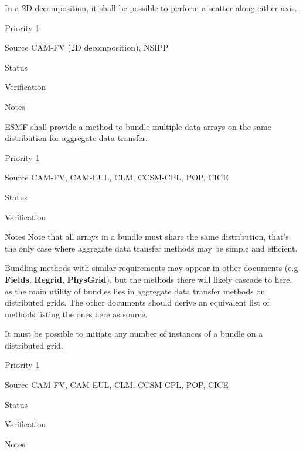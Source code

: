 
In a 2D decomposition, it shall be possible to perform a scatter along
either axis.

\begin{reqlist}
\item[Priority] 1
\item[Source] CAM-FV (2D decomposition), NSIPP
\item[Status]
\item[Verification]
\item[Notes] 
\end{reqlist}


ESMF shall provide a method to bundle multiple data arrays on the same
distribution for aggregate data transfer.

\begin{reqlist}
\item[Priority] 1
\item[Source] CAM-FV, CAM-EUL, CLM, CCSM-CPL, POP, CICE
\item[Status]
\item[Verification]
\item[Notes] Note that all arrays in a bundle must share the same
  distribution, that's the only case where aggregate data transfer
  methods may be simple and efficient.
  
  Bundling methods with similar requirements may appear in other
  documents (e.g \textbf{Fields}, \textbf{Regrid}, \textbf{PhysGrid}),
  but the methods there will likely cascade to here, as the main
  utility of bundles lies in aggregate data transfer methods on
  distributed grids. The other documents should derive an equivalent
  list of methods listing the ones here as source.
\end{reqlist}


It must be possible to initiate any number of instances of a bundle on
a distributed grid.

\begin{reqlist}
\item[Priority] 1
\item[Source] CAM-FV, CAM-EUL, CLM, CCSM-CPL, POP, CICE
\item[Status]
\item[Verification]
\item[Notes]
\end{reqlist}


